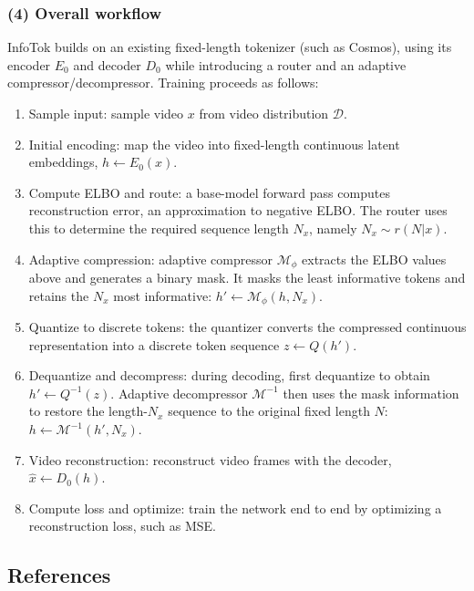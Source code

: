 \hypertarget{overall-workflow}{%
\subsubsection{(4) Overall workflow}\label{overall-workflow}}

InfoTok builds on an existing fixed-length tokenizer (such as Cosmos), using its encoder \(E_0\) and decoder \(D_0\) while introducing a router and an adaptive compressor/decompressor. Training proceeds as follows:

\begin{enumerate}
\def\labelenumi{\arabic{enumi}.}
\tightlist
\item
  Sample input: sample video \(x\) from video distribution \(\mathcal{D}\).
\item
  Initial encoding: map the video into fixed-length continuous latent embeddings, \(h\leftarrow E_0(x)\).
\item
  Compute ELBO and route: a base-model forward pass computes reconstruction error, an approximation to negative ELBO. The router uses this to determine the required sequence length \(N_x\), namely \(N_x\sim r(N|x)\).
\item
  Adaptive compression: adaptive compressor \(\mathcal{M}_\phi\) extracts the ELBO values above and generates a binary mask. It masks the least informative tokens and retains the \(N_x\) most informative: \(h'\leftarrow\mathcal{M}_\phi(h,N_x)\).
\item
  Quantize to discrete tokens: the quantizer converts the compressed continuous representation into a discrete token sequence \(z\leftarrow Q(h')\).
\item
  Dequantize and decompress: during decoding, first dequantize to obtain \(h'\leftarrow Q^{-1}(z)\). Adaptive decompressor \(\mathcal{M}^{-1}\) then uses the mask information to restore the length-\(N_x\) sequence to the original fixed length \(N\): \(h\leftarrow \mathcal{M}^{-1}(h',N_x)\).
\item
  Video reconstruction: reconstruct video frames with the decoder, \(\hat{x}\leftarrow D_0(h)\).
\item
  Compute loss and optimize: train the network end to end by optimizing a reconstruction loss, such as MSE.
\end{enumerate}

\FloatBarrier
{}
\hypertarget{references-140}{%
\subsection{References}\label{references-140}}

